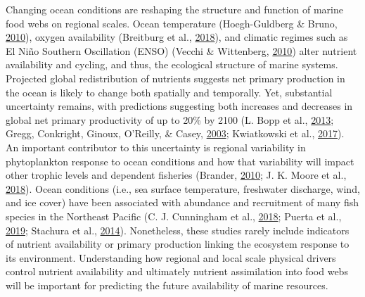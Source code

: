 \documentclass [11pt, proquest] {uwthesis}[2015/03/03]
\begin{document}
Changing ocean conditions are reshaping the structure and function of
marine food webs on regional scales. Ocean temperature (Hoegh-Guldberg
\& Bruno, \protect\hyperlink{ref-Hoegh2010}{2010}), oxygen availability
(Breitburg et al., \protect\hyperlink{ref-Brietburg2018}{2018}), and
climatic regimes such as El Niño Southern Oscillation (ENSO) (Vecchi \&
Wittenberg, \protect\hyperlink{ref-Vecchi2010}{2010}) alter nutrient
availability and cycling, and thus, the ecological structure of marine
systems. Projected global redistribution of nutrients suggests net
primary production in the ocean is likely to change both spatially and
temporally. Yet, substantial uncertainty remains, with predictions
suggesting both increases and decreases in global net primary
productivity of up to 20\% by 2100 (L. Bopp et al.,
\protect\hyperlink{ref-Bopp2013}{2013}; Gregg, Conkright, Ginoux,
O'Reilly, \& Casey, \protect\hyperlink{ref-Gregg2003}{2003}; Kwiatkowski
et al., \protect\hyperlink{ref-Kwiatkowski2017}{2017}). An important
contributor to this uncertainty is regional variability in phytoplankton
response to ocean conditions and how that variability will impact other
trophic levels and dependent fisheries (Brander,
\protect\hyperlink{ref-Brander2010}{2010}; J. K. Moore et al.,
\protect\hyperlink{ref-Moore2018}{2018}). Ocean conditions (i.e., sea
surface temperature, freshwater discharge, wind, and ice cover) have
been associated with abundance and recruitment of many fish species in
the Northeast Pacific (C. J. Cunningham et al.,
\protect\hyperlink{ref-Cunningham2018}{2018}; Puerta et al.,
\protect\hyperlink{ref-Puerta2019}{2019}; Stachura et al.,
\protect\hyperlink{ref-Stachura2014}{2014}). Nonetheless, these studies
rarely include indicators of nutrient availability or primary production
linking the ecosystem response to its environment. Understanding how
regional and local scale physical drivers control nutrient availability
and ultimately nutrient assimilation into food webs will be important
for predicting the future availability of marine resources.
\end{document}
